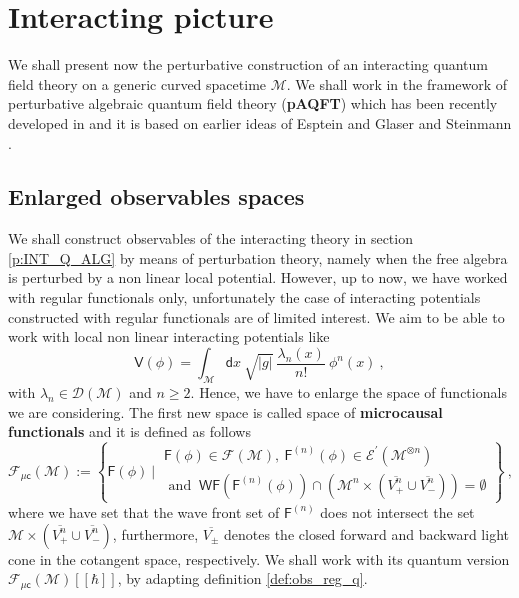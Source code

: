 \documentclass[11pt]{book}
\newcommand{\WF}{\mathsf{WF}}
\newcommand{\muc}{\mu\csf}
\newcommand{\abs}[1]{\left|#1\right|}
\newcommand{\Dcal}{\mathcal{D}}
\newcommand{\Ecal}{\mathcal{E}}
\newcommand{\Fcal}{\mathcal{F}}
\newcommand{\Mcal}{\mathcal{M}}
\newcommand{\Fsf}{\mathsf{F}}
\newcommand{\Vsf}{\mathsf{V}}
\newcommand{\csf}{\mathsf{c}}
\newcommand{\dsf}{\mathsf{d}}
\theoremstyle{break}
\begin{document}
\section{Interacting picture}
\label{p:INTERACTING_PICTURE}


We shall present now the perturbative construction of an interacting quantum field theory on a generic curved spacetime $\Mcal$. We shall work in the framework of perturbative algebraic quantum field theory (\textbf{pAQFT}) which has been recently developed in \cite{brunetti_perturbative_2009,fredenhagen_perturbative_2015,fredenhagen_batalin-vilkovisky_2013} and it is based on earlier ideas of Esptein and Glaser and Steinmann \cite{epstein_glaser,steinmann_perturbation_1971}.


\subsection{Enlarged observables spaces}
\label{p:OBS_ENLARGED}


We shall construct observables of the interacting theory in section \ref{p:INT_Q_ALG} by means of perturbation theory, namely when the free algebra is perturbed by a non linear local potential. However, up to now, we have worked with regular functionals only, unfortunately the case of interacting potentials constructed with regular functionals are of limited interest. We aim to be able to work with local non linear interacting potentials like
%
\begin{equation}
\Vsf(\phi) = \int_\Mcal \dsf x \ \sqrt{\abs{g}} \ \frac{\lambda_n(x)}{n!} \ \phi^n(x) \ ,
\label{eq:local_pot}
\end{equation}
%
with $\lambda_n \in \Dcal(\Mcal)$ and $n\geq2$. Hence, we have to enlarge the space of functionals we are considering. The first new space is  called space of \textbf{microcausal functionals} and it is defined as follows
%
\begin{equation}
\Fcal_{\muc}(\Mcal) := \left\{ 
\Fsf(\phi) \ \bigg| \ 
\begin{array}{l}
\Fsf(\phi) \in \Fcal(\Mcal), \ \Fsf^{(n)}(\phi) \in \Ecal^\prime(\Mcal^{\otimes n}) \\
\mbox{ and } \ \WF(\Fsf^{(n)}(\phi)) \cap \left( \Mcal^n \times ( \overline{V^{n}_{+}} \cup \overline{V^{n}_{-}} ) \right)  = \emptyset 
\end{array}
\right\} \ ,
\label{eq:func_micro}
\end{equation}
\index{$\Fcal_{\mu\csf}(\Mcal)$}%
%
where we have set that the wave front set of $\Fsf^{(n)}$ does not intersect the set $\Mcal \times (\overline{V^n_+} \cup \overline{V^n_-})$, furthermore, $\overline{V_\pm}$ denotes the closed forward and backward light cone in the cotangent space, respectively. We shall work with its quantum version $\Fcal_{\muc}(\Mcal)[[\hbar]]$, by adapting definition \ref{def:obs_reg_q}.
\end{document}
